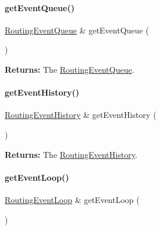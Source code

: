 \paragraph{\texorpdfstring{get\+Event\+Queue()}{getEventQueue()}}
{\footnotesize\ttfamily \mbox{\hyperlink{classKite_1_1RoutingEventQueue}{Routing\+Event\+Queue}} \& get\+Event\+Queue (\begin{DoxyParamCaption}{ }\end{DoxyParamCaption})\hspace{0.3cm}{\ttfamily [inline]}}

{\bfseries Returns\+:} The \mbox{\hyperlink{classKite_1_1RoutingEventQueue}{Routing\+Event\+Queue}}. \mbox{\label{classKite_1_1NegociateWindow_a990d738cf85fa016589edaa08d736d4f}} 
\paragraph{\texorpdfstring{get\+Event\+History()}{getEventHistory()}}
{\footnotesize\ttfamily \mbox{\hyperlink{classKite_1_1RoutingEventHistory}{Routing\+Event\+History}} \& get\+Event\+History (\begin{DoxyParamCaption}{ }\end{DoxyParamCaption})\hspace{0.3cm}{\ttfamily [inline]}}

{\bfseries Returns\+:} The \mbox{\hyperlink{classKite_1_1RoutingEventHistory}{Routing\+Event\+History}}. \mbox{\label{classKite_1_1NegociateWindow_a9a41d40e5e378b9bcb99048262ec15a6}} 
\paragraph{\texorpdfstring{get\+Event\+Loop()}{getEventLoop()}}
{\footnotesize\ttfamily \mbox{\hyperlink{classKite_1_1RoutingEventLoop}{Routing\+Event\+Loop}} \& get\+Event\+Loop (\begin{DoxyParamCaption}{ }\end{DoxyParamCaption})\hspace{0.3cm}{\ttfamily [inline]}}

